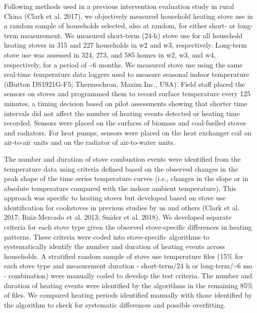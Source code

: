\documentclass[
  letterpaper,
  DIV=11,
  numbers=noendperiod]{scrartcl}
\providecommand{\DIFaddtex}[1]{{\protect\color{blue}\uwave{#1}}} %
\providecommand{\DIFaddbegin}{} %
\providecommand{\DIFaddend}{} %
\providecommand{\DIFdelbegin}{} %
\providecommand{\DIFdelend}{} %
\providecommand{\DIFadd}[1]{\texorpdfstring{\DIFaddtex{#1}}{#1}} %
\newcommand{\DIFscaledelfig}{0.5}
\newlength{\DIFdelgraphicswidth} %
\newlength{\DIFdelgraphicsheight} %
\newcommand{\DIFaddincludegraphics}[2][]{{\color{blue}\fbox{\DIFOincludegraphics[#1]{#2}}}} %
\newcommand{\DIFdelincludegraphics}[2][]{%
\sbox{\DIFdelgraphicsbox}{\DIFOincludegraphics[#1]{#2}}%
\settoboxwidth{\DIFdelgraphicswidth}{\DIFdelgraphicsbox} %
\settoboxtotalheight{\DIFdelgraphicsheight}{\DIFdelgraphicsbox} %
\scalebox{\DIFscaledelfig}{%
\parbox[b]{\DIFdelgraphicswidth}{\usebox{\DIFdelgraphicsbox}\\[-\baselineskip] \rule{\DIFdelgraphicswidth}{0em}}\llap{\resizebox{\DIFdelgraphicswidth}{\DIFdelgraphicsheight}{%
\setlength{\unitlength}{\DIFdelgraphicswidth}%
\begin{picture}(1,1)%
\thicklines\linethickness{2pt} %
{\color[rgb]{1,0,0}\put(0,0){\framebox(1,1){}}}%
{\color[rgb]{1,0,0}\put(0,0){\line( 1,1){1}}}%
{\color[rgb]{1,0,0}\put(0,1){\line(1,-1){1}}}%
\end{picture}%
}\hspace*{3pt}}} %
} %
\DeclareRobustCommand{\DIFaddbegin}{\DIFOaddbegin \let\includegraphics\DIFaddincludegraphics} %
\DeclareRobustCommand{\DIFaddend}{\DIFOaddend \let\includegraphics\DIFOincludegraphics} %
\DeclareRobustCommand{\DIFdelbegin}{\DIFOdelbegin \let\includegraphics\DIFdelincludegraphics} %
\DeclareRobustCommand{\DIFdelend}{\DIFOaddend \let\includegraphics\DIFOincludegraphics} %
\begin{document}
Following methods used in a previous intervention evaluation study in
rural China (Clark et al. 2017), we objectively measured household
heating stove use in a random sample of households selected, also at
random, for either short- or long-term measurement. We measured
short-term (24-h) stove use for all household heating stoves in 315 and
227 households in w2 and w3, respectively. Long-term stove use was
assessed in 324, 273, and 585 homes in w2, w3, and w4, respectively, for
a period of \textasciitilde6 months. We measured stove use using the
same real-time temperature data loggers used to measure seasonal indoor
temperature (iButton DS1921G-F5; Thermochron, Maxim Inc., USA). Field
staff placed the sensors on stoves and programmed them to record surface
temperature every 125 minutes, a timing decision based on pilot
assessments showing that shorter time intervals did not affect the
number of heating events detected or heating time recorded. Sensors were
placed on the surfaces of biomass and coal-fuelled stoves and radiators.
For heat pumps, sensors were placed on the heat exchanger coil on
air-to-air units and on the radiator of air-to-water units.

The number and duration of stove combustion events were identified from
the temperature data using criteria defined based on the observed
changes in the peak shape of the time series temperature curves (i.e.,
changes in the slope or in absolute temperature compared with the indoor
ambient temperature). This approach was specific to heating stoves but
developed based on stove use identification for cookstoves in previous
studies by us and others (Clark et al. 2017; Ruiz-Mercado et al. 2013;
Snider et al. 2018). We developed separate criteria for each stove type
given the observed stove-specific differences in heating patterns. These
criteria were coded into stove-specific algorithms to systematically
identify the number and duration of heating events across households. A
stratified random sample of stove use temperature files (15\% for each
stove type and measurement duration - short-term/24 h or
long-term/\textasciitilde6 mo - combination) were manually coded to
develop the test criteria. The number and duration of heating events
were identified by the algorithms in the remaining 85\% of files. We
compared heating periods identified manually with those identified by
the algorithm to check for systematic differences and possible
overfitting.

\DIFdelbegin %
\DIFdelend \DIFaddbegin \subsubsection{\DIFadd{Questionnaires}}\label{questionnaires}
\DIFaddend 
\end{document}
